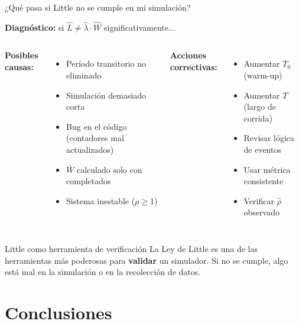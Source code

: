 \documentclass[aspectratio=1610, 9pt]{beamer}
\begin{document}
\begin{frame}{¿Qué pasa si Little no se cumple en mi simulación?}

\textbf{Diagnóstico:} si $\hat{L} \neq \hat{\lambda}\cdot\hat{W}$ significativamente...

\vspace{0.4cm}
\begin{columns}
\textcolor{rojoclaro}{\textbf{Posibles causas:}}
\begin{itemize}
    \item Período transitorio no eliminado
    \item Simulación demasiado corta
    \item Bug en el código (contadores mal actualizados)
    \item $\bar{W}$ calculado solo con completados
    \item Sistema inestable ($\rho \geq 1$)
\end{itemize}

\textcolor{verdeoscuro}{\textbf{Acciones correctivas:}}
\begin{itemize}
    \item Aumentar $T_0$ (warm-up)
    \item Aumentar $T$ (largo de corrida)
    \item Revisar lógica de eventos
    \item Usar métrica consistente
    \item Verificar $\hat{\rho}$ observado
\end{itemize}
\end{columns}

\vspace{0.4cm}
\begin{block}{Little como herramienta de verificación}
La Ley de Little es una de las herramientas más poderosas para \textbf{validar} un simulador. Si no se cumple, algo está mal en la simulación o en la recolección de datos.
\end{block}
\end{frame}

\section{Conclusiones}
\end{document}
